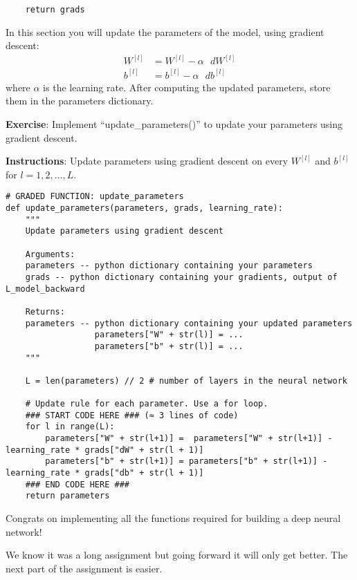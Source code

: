 {\begin{verbatim}
    return grads
\end{verbatim}



In this section you will update the parameters of the model, using gradient descent: 
\begin{align}
W^{[l]} &= W^{[l]} - \alpha \text{ } dW^{[l]} \\
b^{[l]} &= b^{[l]} - \alpha \text{ } db^{[l]}
\end{align}
where $\alpha$ is the learning rate. After computing the updated parameters, store them in the parameters dictionary. 

{\textbf {Exercise}}: Implement ``update\_parameters()'' to update your parameters using gradient descent.

{\textbf {Instructions}}:
Update parameters using gradient descent on every $W^{[l]}$ and $b^{[l]}$ for $l = 1, 2, ..., L$. 
\begin{verbatim}
# GRADED FUNCTION: update_parameters
def update_parameters(parameters, grads, learning_rate):
    """
    Update parameters using gradient descent
    
    Arguments:
    parameters -- python dictionary containing your parameters 
    grads -- python dictionary containing your gradients, output of L_model_backward
    
    Returns:
    parameters -- python dictionary containing your updated parameters 
                  parameters["W" + str(l)] = ... 
                  parameters["b" + str(l)] = ...
    """
    
    L = len(parameters) // 2 # number of layers in the neural network

    # Update rule for each parameter. Use a for loop.
    ### START CODE HERE ### (≈ 3 lines of code)
    for l in range(L):
        parameters["W" + str(l+1)] =  parameters["W" + str(l+1)] - learning_rate * grads["dW" + str(l + 1)]
        parameters["b" + str(l+1)] = parameters["b" + str(l+1)] - learning_rate * grads["db" + str(l + 1)]
    ### END CODE HERE ###
    return parameters
\end{verbatim}





Congrats on implementing all the functions required for building a deep neural network!

We know it was a long assignment but going forward it will only get better. The next part of the assignment is easier.

}
